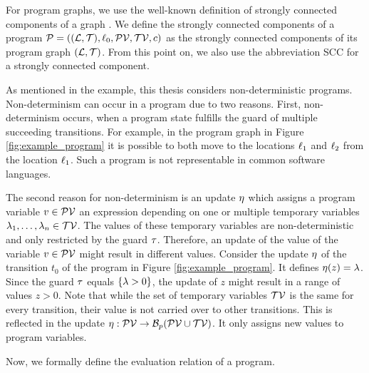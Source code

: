 For program graphs, we use the well-known definition of strongly connected components of a graph \cite{sccs}.
We define the strongly connected components of a program $\mathcal{P} = ((\mathcal{L}, \mathcal{T}), \ell_0, \mathcal{PV}, \mathcal{TV}, c)$ as the strongly connected components of its program graph $(\mathcal{L}, \mathcal{T})$.
From this point on, we also use the abbreviation SCC for a strongly connected component.

As mentioned in the example, this thesis considers non-deterministic programs.
Non-determinism can occur in a program due to two reasons.
First, non-determinism occurs, when a program state fulfills the guard of multiple succeeding transitions. 
For example, in the program graph in Figure \ref{fig:example_program} it is possible to both move to the locations $\ell_1$ and $\ell_2$ from the location $\ell_1$.
Such a program is not representable in common software languages.

The second reason for non-determinism is an update $\eta$ which assigns a program variable $v \in \mathcal{PV}$ an expression depending on one or multiple temporary variables $\lambda_1, \dots, \lambda_n \in \mathcal{TV}$.
The values of these temporary variables are non-deterministic and only restricted by the guard $\tau$.
Therefore, an update of the value of the variable $v \in \mathcal{PV}$ might result in different values.
Consider the update $\eta$ of the transition $t_0$ of the program in Figure \ref{fig:example_program}.
It defines $\eta(z) = \lambda$.
Since the guard $\tau$ equals $\lbrace \lambda > 0 \rbrace$, the update of $z$ might result in a range of values $z > 0$. 
Note that while the set of temporary variables $\mathcal{TV}$ is the same for every transition, their value is not carried over to other transitions.
This is reflected in the update $\eta: \mathcal{PV} \rightarrow \mathcal{B}_p(\mathcal{PV} \cup \mathcal{TV})$.
It only assigns new values to program variables.

Now, we formally define the evaluation relation of a program.

